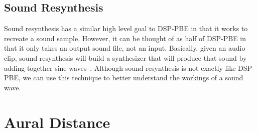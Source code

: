 \documentclass[english, 11pt]{article}
\begin{document}
\begin{comment}
\subsubsection{White Noise}
\textbf{Last thing that we do, will check back once I'm done with refinement types for others} \\
White noise is a random signal with equal intensities at different frequencies. What does white noise do to sample? Mask it? \\

\textbf{Equation:}
\texttt{$y[n]$ = ($a_0$ * $x[n]$) + random (1 - $a_0$)}
\par Where random is a random number from ? to ? to represent ?. \\ \\
Also, shouldn't there not be a refinement type for it? Aren't we just adding it to a high pass or low pass filter to get some variance in the filter?
\end{comment}

\subsection{Sound Resynthesis}

Sound resynthesis has a similar high level goal to DSP-PBE in that it works to recreate a sound sample. However, it can be thought of as half of DSP-PBE in that it only takes an output sound file, not an input. Basically, given an audio clip, sound resynthesis will build a synthesizer that will produce that sound by adding together sine waves~\cite{resynthesis}. Although sound resynthesis is not exactly like DSP-PBE, we can use this technique to better understand the workings of a sound wave.

\section{Aural Distance}
\end{document}
